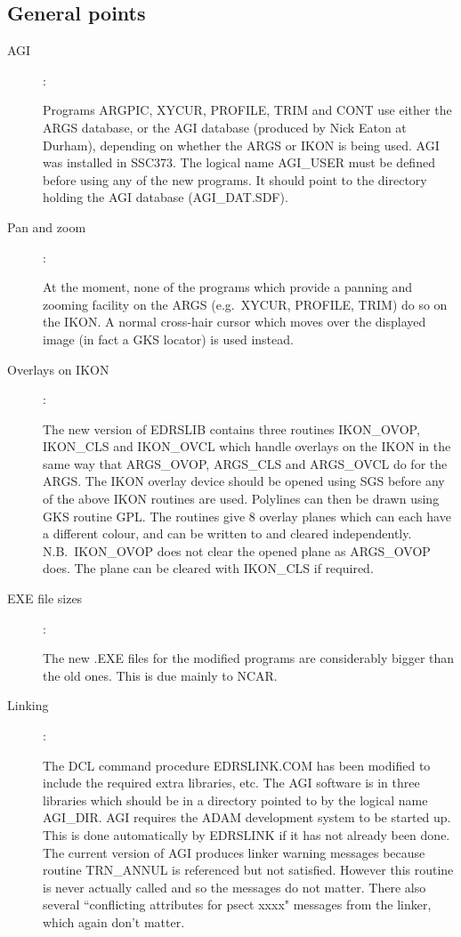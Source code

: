 \subsection{General points}
\begin{description}

\item [AGI]:

Programs ARGPIC, XYCUR, PROFILE, TRIM and CONT use either the ARGS database,
or the AGI database (produced by Nick Eaton at Durham), depending on whether
the ARGS or IKON is being used.
AGI was installed in SSC373.
The logical name AGI\_USER must be defined before using any of the new programs.
It should point to the directory holding the AGI database (AGI\_DAT.SDF).

\item [Pan and zoom]:

At the moment, none of the programs which provide a panning and zooming facility
on the ARGS (e.g.\ XYCUR, PROFILE, TRIM) do so on the IKON.
A normal cross-hair cursor which moves over the displayed image (in fact a GKS
locator) is used instead.

\item [Overlays on IKON]:

The new version of EDRSLIB contains three routines IKON\_OVOP, IKON\_CLS and
IKON\_OVCL which handle overlays on the IKON in the same way that ARGS\_OVOP,
ARGS\_CLS and ARGS\_OVCL do for the ARGS.
The IKON overlay device should be opened using SGS before any of the above
IKON routines are used.
Polylines can then be drawn using GKS routine GPL.
The routines give 8 overlay planes which can each have a different colour, and
can be written to and cleared independently.
N.B.\ IKON\_OVOP does not clear the opened plane as ARGS\_OVOP does.
The plane can be cleared with IKON\_CLS if required.

\item [EXE file sizes]:

The new .EXE files for the modified programs are considerably bigger than the
old ones.
This is due mainly to NCAR.

\item [Linking]:

The DCL command procedure EDRSLINK.COM has been modified to include the
required extra libraries, etc.
The AGI software is in three libraries which should be in a directory pointed
to by the logical name AGI\_DIR.
AGI requires the ADAM development system to be started up.
This is done automatically by EDRSLINK if it has not already been done.
The current version of AGI produces linker warning messages because routine
TRN\_ANNUL is referenced but not satisfied.
However this routine is never actually called and so the messages do not
matter.
There also several ``conflicting attributes for psect xxxx" messages from the
linker, which again don't matter.


\end{description}
